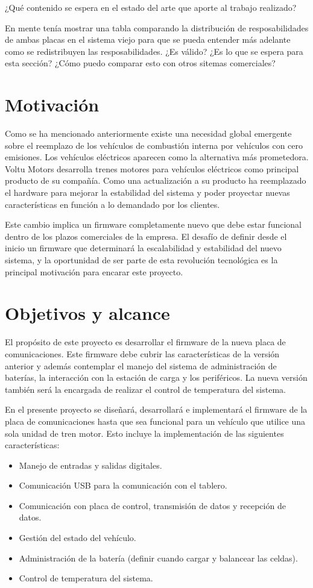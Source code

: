 ¿Qué contenido se espera en el estado del arte que aporte al trabajo realizado?

En mente tenía mostrar una tabla comparando la distribución de resposabilidades de ambas placas en el sistema viejo para que se pueda entender más adelante como se redistribuyen las resposabilidades. ¿Es válido? ¿Es lo que se espera para esta sección? ¿Cómo puedo comparar esto con otros sitemas comerciales?

\section{Motivación}
Como se ha mencionado anteriormente existe una necesidad global emergente sobre el reemplazo de los vehículos de combustión interna por vehículos con cero emisiones. Los vehículos 
eléctricos aparecen como la alternativa más prometedora. Voltu Motors desarrolla trenes motores para vehículos eléctricos como principal producto de su compañía. Como una actualización a su producto
ha reemplazado el hardware para mejorar la estabilidad del sistema y poder proyectar nuevas características en función a lo demandado por los clientes.

Este cambio implica un firmware completamente nuevo que debe estar funcional dentro de los plazos comerciales de la empresa. El desafío de definir desde el inicio
un firmware que determinará la escalabilidad y estabilidad del nuevo sistema, y la oportunidad de ser parte de esta revolución tecnológica es la principal motivación para encarar este proyecto. 

\section{Objetivos y alcance}

El propósito de este proyecto es desarrollar el firmware de la nueva placa de comunicaciones. Este firmware debe cubrir las características de la versión anterior y además contemplar 
el manejo del sistema de administración de baterías, la interacción con la estación de carga y los periféricos.
La nueva versión también será la encargada de realizar el control de temperatura del sistema.

En el presente proyecto se diseñará, desarrollará e implementará el firmware de la placa de comunicaciones hasta que sea funcional para un vehículo que utilice una sola unidad de tren motor.
Esto incluye la implementación de las siguientes características:
\begin{itemize}
	\item Manejo de entradas y salidas digitales.
	\item Comunicación USB para la comunicación con el tablero.
	\item Comunicación con placa de control, transmisión de datos y recepción de datos.
	\item Gestión del estado del vehículo.
	\item Administración de la batería (definir cuando cargar y balancear las celdas).
	\item Control de temperatura del sistema.
\end{itemize}